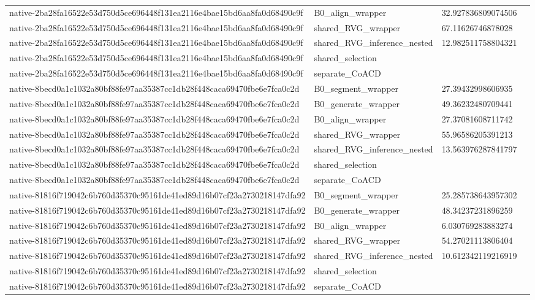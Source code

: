 \begin{tabular}{llll}
native-2ba28fa16522e53d750d5ce696448f131ea2116e4bae15bd6aa8fa0d68490c9f & B0\_align\_wrapper & 32.927836809074506 &  \\
native-2ba28fa16522e53d750d5ce696448f131ea2116e4bae15bd6aa8fa0d68490c9f & shared\_RVG\_wrapper & 67.11626746878028 &  \\
native-2ba28fa16522e53d750d5ce696448f131ea2116e4bae15bd6aa8fa0d68490c9f & shared\_RVG\_inference\_nested & 12.982511758804321 &  \\
native-2ba28fa16522e53d750d5ce696448f131ea2116e4bae15bd6aa8fa0d68490c9f & shared\_selection &  &  \\
native-2ba28fa16522e53d750d5ce696448f131ea2116e4bae15bd6aa8fa0d68490c9f & separate\_CoACD &  &  \\
native-8becd0a1c1032a80bf88fe97aa35387cc1db28f448caca69470fbe6e7fca0c2d & B0\_segment\_wrapper & 27.39432998606935 &  \\
native-8becd0a1c1032a80bf88fe97aa35387cc1db28f448caca69470fbe6e7fca0c2d & B0\_generate\_wrapper & 49.36232480709441 &  \\
native-8becd0a1c1032a80bf88fe97aa35387cc1db28f448caca69470fbe6e7fca0c2d & B0\_align\_wrapper & 27.37081608711742 &  \\
native-8becd0a1c1032a80bf88fe97aa35387cc1db28f448caca69470fbe6e7fca0c2d & shared\_RVG\_wrapper & 55.96586205391213 &  \\
native-8becd0a1c1032a80bf88fe97aa35387cc1db28f448caca69470fbe6e7fca0c2d & shared\_RVG\_inference\_nested & 13.563976287841797 &  \\
native-8becd0a1c1032a80bf88fe97aa35387cc1db28f448caca69470fbe6e7fca0c2d & shared\_selection &  &  \\
native-8becd0a1c1032a80bf88fe97aa35387cc1db28f448caca69470fbe6e7fca0c2d & separate\_CoACD &  &  \\
native-81816f719042c6b760d35370c95161de41ed89d16b07cf23a2730218147dfa92 & B0\_segment\_wrapper & 25.285738643957302 &  \\
native-81816f719042c6b760d35370c95161de41ed89d16b07cf23a2730218147dfa92 & B0\_generate\_wrapper & 48.34237231896259 &  \\
native-81816f719042c6b760d35370c95161de41ed89d16b07cf23a2730218147dfa92 & B0\_align\_wrapper & 6.030769283883274 &  \\
native-81816f719042c6b760d35370c95161de41ed89d16b07cf23a2730218147dfa92 & shared\_RVG\_wrapper & 54.27021113806404 &  \\
native-81816f719042c6b760d35370c95161de41ed89d16b07cf23a2730218147dfa92 & shared\_RVG\_inference\_nested & 10.612342119216919 &  \\
native-81816f719042c6b760d35370c95161de41ed89d16b07cf23a2730218147dfa92 & shared\_selection &  &  \\
native-81816f719042c6b760d35370c95161de41ed89d16b07cf23a2730218147dfa92 & separate\_CoACD &  &  \\
\end{tabular}
